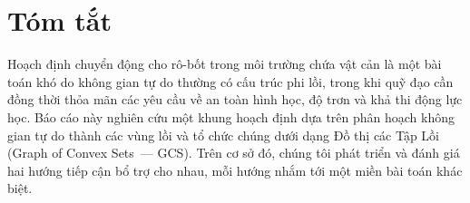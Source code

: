 


\section*{\Huge Tóm tắt}

Hoạch định chuyển động cho rô-bốt trong môi trường chứa vật cản là một bài toán khó do không gian tự do thường có cấu trúc phi lồi, trong khi quỹ đạo cần đồng thời thỏa mãn các yêu cầu về an toàn hình học, độ trơn và khả thi động lực học.
Báo cáo này nghiên cứu một khung hoạch định dựa trên phân hoạch không gian tự do thành các vùng lồi và tổ chức chúng dưới dạng Đồ thị các Tập Lồi (Graph of Convex Sets~--- GCS).
Trên cơ sở đó, chúng tôi phát triển và đánh giá hai hướng tiếp cận bổ trợ cho nhau, mỗi hướng nhắm tới một miền bài toán khác biệt.

